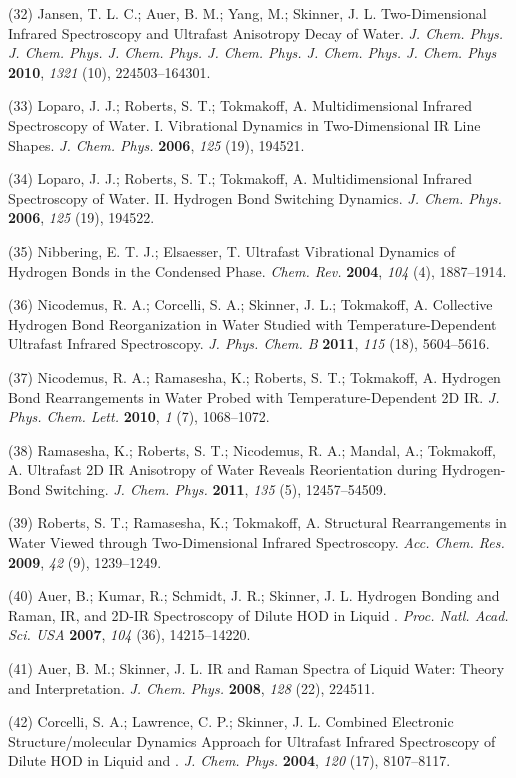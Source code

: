 (32) Jansen, T. L. C.; Auer, B. M.; Yang, M.; Skinner, J. L.  Two-Dimensional Infrared Spectroscopy and Ultrafast Anisotropy Decay of Water. \emph{J. Chem. Phys. J. Chem. Phys. J. Chem. Phys. J. Chem. Phys.  J. Chem. Phys. J. Chem. Phys} \textbf{2010}, \emph{1321} (10), 224503--164301.

(33) Loparo, J. J.; Roberts, S. T.; Tokmakoff, A. Multidimensional Infrared Spectroscopy of Water. I. Vibrational Dynamics in Two-Dimensional IR Line Shapes. \emph{J. Chem. Phys.} \textbf{2006}, \emph{125} (19), 194521.

(34) Loparo, J. J.; Roberts, S. T.; Tokmakoff, A. Multidimensional Infrared Spectroscopy of Water. II. Hydrogen Bond Switching Dynamics.  \emph{J. Chem. Phys.} \textbf{2006}, \emph{125} (19), 194522.

(35) Nibbering, E. T. J.; Elsaesser, T. Ultrafast Vibrational Dynamics of Hydrogen Bonds in the Condensed Phase. \emph{Chem. Rev.}  \textbf{2004}, \emph{104} (4), 1887--1914.

(36) Nicodemus, R. A.; Corcelli, S. A.; Skinner, J. L.; Tokmakoff, A.  Collective Hydrogen Bond Reorganization in Water Studied with Temperature-Dependent Ultrafast Infrared Spectroscopy. \emph{J. Phys.  Chem. B} \textbf{2011}, \emph{115} (18), 5604--5616.

(37) Nicodemus, R. A.; Ramasesha, K.; Roberts, S. T.; Tokmakoff, A.  Hydrogen Bond Rearrangements in Water Probed with Temperature-Dependent 2D IR. \emph{J. Phys. Chem. Lett.} \textbf{2010}, \emph{1} (7), 1068--1072.

(38) Ramasesha, K.; Roberts, S. T.; Nicodemus, R. A.; Mandal, A.; Tokmakoff, A. Ultrafast 2D IR Anisotropy of Water Reveals Reorientation during Hydrogen-Bond Switching. \emph{J. Chem. Phys.} \textbf{2011}, \emph{135} (5), 12457--54509.

(39) Roberts, S. T.; Ramasesha, K.; Tokmakoff, A. Structural Rearrangements in Water Viewed through Two-Dimensional Infrared Spectroscopy. \emph{Acc. Chem. Res.} \textbf{2009}, \emph{42} (9), 1239--1249.

(40) Auer, B.; Kumar, R.; Schmidt, J. R.; Skinner, J. L. Hydrogen Bonding and Raman, IR, and 2D-IR Spectroscopy of Dilute HOD in Liquid . \emph{Proc. Natl. Acad. Sci. USA} \textbf{2007}, \emph{104} (36), 14215--14220.

(41) Auer, B. M.; Skinner, J. L. IR and Raman Spectra of Liquid Water: Theory and Interpretation. \emph{J. Chem. Phys.} \textbf{2008}, \emph{128} (22), 224511.

(42) Corcelli, S. A.; Lawrence, C. P.; Skinner, J. L. Combined Electronic Structure/molecular Dynamics Approach for Ultrafast Infrared Spectroscopy of Dilute HOD in Liquid  and . \emph{J. Chem. Phys.} \textbf{2004}, \emph{120} (17), 8107--8117.

